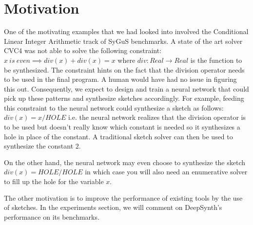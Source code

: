 \section{Motivation}

One of the motivating examples that we had looked into involved the Conditional Linear Integer Arithmetic track of SyGuS benchmarks. A state of the art solver CVC4 was not able to solve the following constraint: $x\ is\ even \implies div(x) + div(x) = x$ where $div: Real \rightarrow Real$ is the function to be synthesized. The constraint hints on the fact that the division operator needs to be used in the final program. A human would have had no issue in figuring this out. Consequently, we expect to design and train a neural network that could pick up these patterns and synthesize sketches accordingly. For example, feeding this constraint to the neural network could synthesize a sketch as follows: $div(x) = x / HOLE$ i.e. the neural network realizes that the division operator is to be used but doesn't really know which constant is needed so it synthesizes a hole in place of the constant. A traditional sketch solver can then be used to synthesize the constant $2$.

On the other hand, the neural network may even choose to synthesize the sketch $div(x) = HOLE / HOLE$ in which case you will also need an enumerative solver to fill up the hole for the variable $x$.

The other motivation is to improve the performance of existing tools by the use of sketches. In the experiments section, we will comment on DeepSynth's performance on its benchmarks.